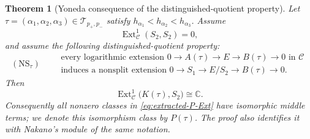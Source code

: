 \documentclass[12pt,leqno]{amsart}
\numberwithin{equation}{section}
\newtheorem{thm}{Theorem}[section]
\newcommand{\Ext}{\operatorname{Ext}}
\def\C{\mathbb{C}}
\begin{document}
\begin{thm}[Yoneda consequence of the distinguished-quotient property]
\label{thm:Nakano-input}
Let $\tau=(\alpha_1,\alpha_2,\alpha_3)\in\mathcal T_{p_+,p_-}$
satisfy $h_{\alpha_1}<h_{\alpha_2}<h_{\alpha_3}$.  Assume
\begin{equation}\label{eq:self-Ext-S2-hypothesis}
 \Ext^1_{\mathscr C}(S_2,S_2)=0,
\end{equation}
and assume the following distinguished-quotient property:
\begin{equation}\label{eq:NS-tau}
 (\mathrm{NS}_\tau)\qquad
 \begin{gathered}
 \text{every logarithmic extension }0\to A(\tau)\to E\to B(\tau)\to0
 \text{ in }\mathscr C\\
 \text{induces a nonsplit extension }
 0\to S_1\to E/S_2\to B(\tau)\to0.
 \end{gathered}
\end{equation}
Then
\begin{equation}\label{eq:extracted-P-Ext}
 \Ext^1_{\mathscr C}\bigl(K(\tau),S_2\bigr)\cong\C.
\end{equation}
Consequently all nonzero classes in \eqref{eq:extracted-P-Ext} have
isomorphic middle terms; we denote this isomorphism class by $P(\tau)$.
The proof also identifies it with Nakano's module of the same notation.
\end{thm}
\end{document}
